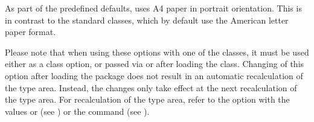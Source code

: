 As part of the predefined defaults, {\KOMAScript} uses A4 paper in
portrait orientation. This is in contrast to the standard classes,
which by default use the American letter paper format.

Please note that when using these options with one of the {\KOMAScript}
classes, it must be used either as a class option, or passed via
 or  after loading the
class. Changing of this option after loading the 
package does not result in an automatic recalculation of the
type area. Instead, the changes only take effect at the next
recalculation of the type area. For recalculation of the type area,
refer to the  option with the values  or
 (see ) or
the  command (see
).%
%
\EndIndexGroup


